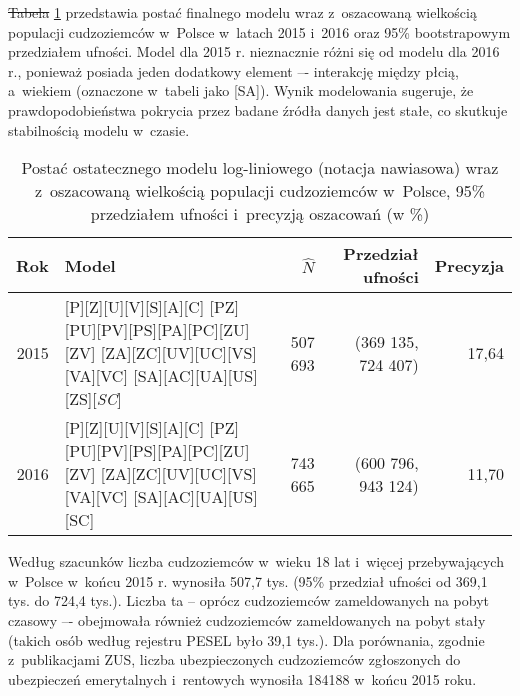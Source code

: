 \documentclass[12pt,a4paper]{article}
\providecommand{\DIFadd}[1]{{\protect\color{blue}\uwave{#1}}} %
\providecommand{\DIFdel}[1]{{\protect\color{red}\sout{#1}}}                      %
\providecommand{\DIFaddbegin}{} %
\providecommand{\DIFaddend}{} %
\providecommand{\DIFdelbegin}{} %
\providecommand{\DIFdelend}{} %
\providecommand{\DIFaddbeginFL}{} %
\providecommand{\DIFaddendFL}{} %
\providecommand{\DIFdelbeginFL}{} %
\providecommand{\DIFdelendFL}{} %
\begin{document}
\DIFdelbegin \DIFdel{Tabela }\DIFdelend \DIFaddbegin \DIFadd{Tablica }\DIFaddend \ref{tab-modele-zapis} przedstawia postać finalnego modelu wraz z~oszacowaną wielkością populacji cudzoziemców w~Polsce w~latach 2015 i~2016 oraz 95\% bootstrapowym przedziałem ufności. Model dla 2015 r. nieznacznie różni się od modelu dla 2016 r., ponieważ posiada jeden dodatkowy element –- interakcję między płcią, a~wiekiem (oznaczone w~tabeli jako [SA]). Wynik modelowania sugeruje, że prawdopodobieństwa pokrycia przez badane źródła danych jest stałe, co skutkuje stabilnością modelu w~czasie. 

\begin{table}[ht!]
    \centering
    \caption{Postać ostatecznego modelu log-liniowego (notacja nawiasowa) wraz z~oszacowaną wielkością populacji cudzoziemców w~Polsce, 95\% przedziałem ufności i~precyzją oszacowań (w \%)}
    \label{tab-modele-zapis}
    \begin{tabular}{rp{7cm}rrr}
    \hline
    Rok & Model & $\hat{N}$ & Przedział ufności & Precyzja \\
    \hline
      2015  & [P][Z][U][V][S][A][C] [PZ][PU][PV][PS][PA][PC][ZU][ZV] [ZA][ZC][UV][UC][VS][VA][VC] [SA][AC][UA][US][ZS][\textit{SC}] &  507 693 & 
      (369 135, 724 407) & 
      17,64 \\

      2016   & [P][Z][U][V][S][A][C] [PZ][PU][PV][PS][PA][PC][ZU][ZV] [ZA][ZC][UV][UC][VS][VA][VC] [SA][AC][UA][US][SC]  &  743 665 & 
      (600 796, 943 124) & 
      11,70 \\
\hline
    \end{tabular}
    \DIFdelbeginFL %

\DIFdelendFL \DIFaddbeginFL {}
\DIFaddendFL \end{table}

Według szacunków liczba cudzoziemców w~wieku 18 lat i~więcej przebywających w~Polsce w~końcu 2015 r. wynosiła 507,7 tys. (95\% przedział ufności od 369,1 tys. do 724,4 tys.). Liczba ta – oprócz cudzoziemców zameldowanych na pobyt czasowy –- obejmowała również cudzoziemców zameldowanych na pobyt stały (takich osób według rejestru PESEL było 39,1 tys.). Dla porównania, zgodnie z~publikacjami ZUS, liczba ubezpieczonych cudzoziemców zgłoszonych do ubezpieczeń emerytalnych i~rentowych wynosiła 184\DIFaddbegin \DIFadd{~}\DIFaddend 188 w~końcu 2015 roku. 
\end{document}
